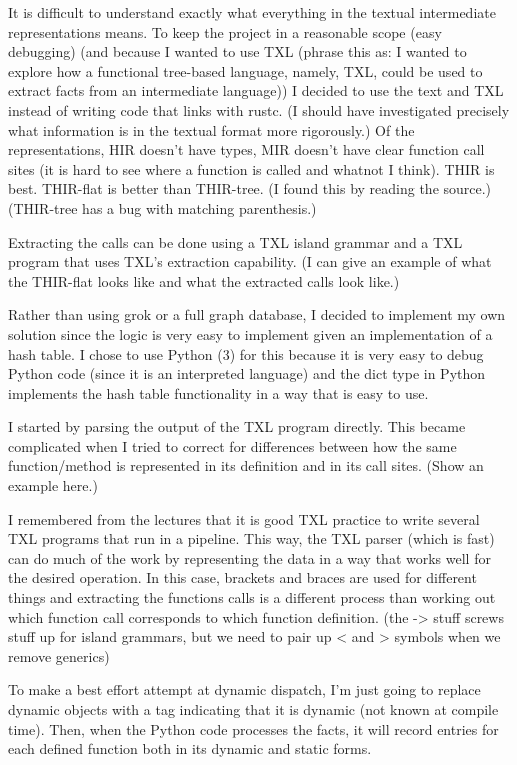 \documentclass[11pt]{article}
\begin{document}
It is difficult to understand exactly what everything in the textual intermediate representations means.
To keep the project in a reasonable scope (easy debugging) (and because I wanted to use TXL (phrase this as: I wanted to explore how a functional tree-based language, namely, TXL, could be used to extract facts from an intermediate language)) I decided to use the text and TXL instead of writing code that links with rustc.
(I should have investigated precisely what information is in the textual format more rigorously.)
Of the representations, HIR doesn't have types, MIR doesn't have clear function call sites (it is hard to see where a function is called and whatnot I think).
THIR is best.
THIR-flat is better than THIR-tree. (I found this by reading the source.)
(THIR-tree has a bug with matching parenthesis.)

Extracting the calls can be done using a TXL island grammar and a TXL program that uses TXL's extraction capability.
(I can give an example of what the THIR-flat looks like and what the extracted calls look like.)

Rather than using grok or a full graph database, I decided to implement my own solution since the logic is very easy to implement given an implementation of a hash table.
I chose to use Python (3) for this because it is very easy to debug Python code (since it is an interpreted language) and the dict type in Python implements the hash table functionality in a way that is easy to use.

I started by parsing the output of the TXL program directly.
This became complicated when I tried to correct for differences between how the same function/method is represented in its definition and in its call sites.
(Show an example here.)

I remembered from the lectures that it is good TXL practice to write several TXL programs that run in a pipeline.
This way, the TXL parser (which is fast) can do much of the work by representing the data in a way that works well for the desired operation.
In this case, brackets and braces are used for different things and extracting the functions calls is a different process than working out which function call corresponds to which function definition.
(the -> stuff screws stuff up for island grammars, but we need to pair up < and > symbols when we remove generics)

To make a best effort attempt at dynamic dispatch, I'm just going to replace dynamic objects with a tag indicating that it is dynamic (not known at compile time).
Then, when the Python code processes the facts, it will record entries for each defined function both in its dynamic and static forms.
\end{document}
